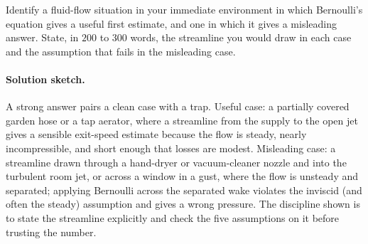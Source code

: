 \begin{exercise}
Identify a fluid-flow situation in your immediate environment in
which Bernoulli's equation gives a useful first estimate, and one
in which it gives a misleading answer. State, in $200$ to $300$
words, the streamline you would draw in each case and the
assumption that fails in the misleading case.

\paragraph{Solution sketch.} A strong answer pairs a clean case with
a trap. Useful case: a partially covered garden hose or a tap aerator,
where a streamline from the supply to the open jet gives a sensible
exit-speed estimate because the flow is steady, nearly incompressible,
and short enough that losses are modest. Misleading case: a streamline
drawn through a hand-dryer or vacuum-cleaner nozzle and into the
turbulent room jet, or across a window in a gust, where the flow is
unsteady and separated; applying Bernoulli across the separated wake
violates the inviscid (and often the steady) assumption and gives a
wrong pressure. The discipline shown is to state the streamline
explicitly and check the five assumptions on it before trusting the
number.
\end{exercise}
